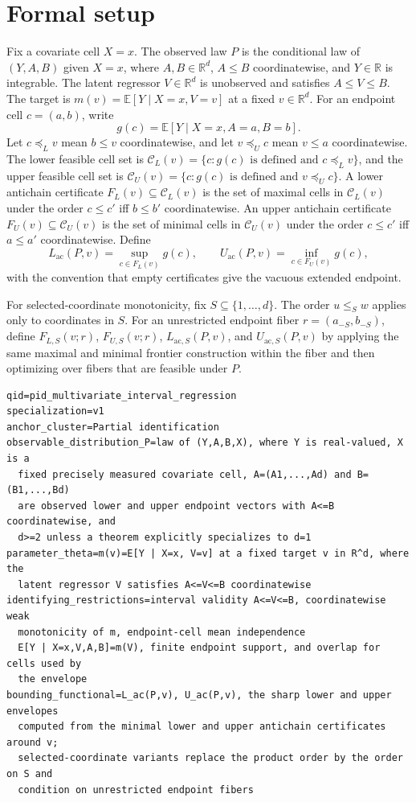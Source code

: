 \documentclass[11pt]{article}
\newcommand{\E}{\mathbb{E}}
\newcommand{\R}{\mathbb{R}}
\theoremstyle{definition}
\theoremstyle{plain}
\theoremstyle{remark}
\begin{document}
\section{Formal setup}
Fix a covariate cell \(X=x\).  The observed law \(P\) is the conditional law of \((Y,A,B)\) given \(X=x\), where \(A,B\in\R^d\), \(A\le B\) coordinatewise, and \(Y\in\R\) is integrable.  The latent regressor \(V\in\R^d\) is unobserved and satisfies \(A\le V\le B\).  The target is \(m(v)=\E[Y\mid X=x,V=v]\) at a fixed \(v\in\R^d\).  For an endpoint cell \(c=(a,b)\), write
\[
g(c)=\E[Y\mid X=x,A=a,B=b].
\]
Let \(c\preceq_L v\) mean \(b\le v\) coordinatewise, and let \(v\preceq_U c\) mean \(v\le a\) coordinatewise.  The lower feasible cell set is \(\mathcal C_L(v)=\{c:g(c)\text{ is defined and }c\preceq_L v\}\), and the upper feasible cell set is \(\mathcal C_U(v)=\{c:g(c)\text{ is defined and }v\preceq_U c\}\).  A lower antichain certificate \(F_L(v)\subseteq\mathcal C_L(v)\) is the set of maximal cells in \(\mathcal C_L(v)\) under the order \(c\le c'\) iff \(b\le b'\) coordinatewise.  An upper antichain certificate \(F_U(v)\subseteq\mathcal C_U(v)\) is the set of minimal cells in \(\mathcal C_U(v)\) under the order \(c\le c'\) iff \(a\le a'\) coordinatewise.  Define
\[
L_{\mathrm{ac}}(P,v)=\sup_{c\in F_L(v)} g(c),\qquad
U_{\mathrm{ac}}(P,v)=\inf_{c\in F_U(v)} g(c),
\]
with the convention that empty certificates give the vacuous extended endpoint.

For selected-coordinate monotonicity, fix \(S\subseteq\{1,\ldots,d\}\).  The order \(u\le_S w\) applies only to coordinates in \(S\).  For an unrestricted endpoint fiber \(r=(a_{-S},b_{-S})\), define \(F_{L,S}(v;r)\), \(F_{U,S}(v;r)\), \(L_{\mathrm{ac},S}(P,v)\), and \(U_{\mathrm{ac},S}(P,v)\) by applying the same maximal and minimal frontier construction within the fiber and then optimizing over fibers that are feasible under \(P\).

\begin{verbatim}
qid=pid_multivariate_interval_regression
specialization=v1
anchor_cluster=Partial identification
observable_distribution_P=law of (Y,A,B,X), where Y is real-valued, X is a
  fixed precisely measured covariate cell, A=(A1,...,Ad) and B=(B1,...,Bd)
  are observed lower and upper endpoint vectors with A<=B coordinatewise, and
  d>=2 unless a theorem explicitly specializes to d=1
parameter_theta=m(v)=E[Y | X=x, V=v] at a fixed target v in R^d, where the
  latent regressor V satisfies A<=V<=B coordinatewise
identifying_restrictions=interval validity A<=V<=B, coordinatewise weak
  monotonicity of m, endpoint-cell mean independence
  E[Y | X=x,V,A,B]=m(V), finite endpoint support, and overlap for cells used by
  the envelope
bounding_functional=L_ac(P,v), U_ac(P,v), the sharp lower and upper envelopes
  computed from the minimal lower and upper antichain certificates around v;
  selected-coordinate variants replace the product order by the order on S and
  condition on unrestricted endpoint fibers
\end{verbatim}
\end{document}

